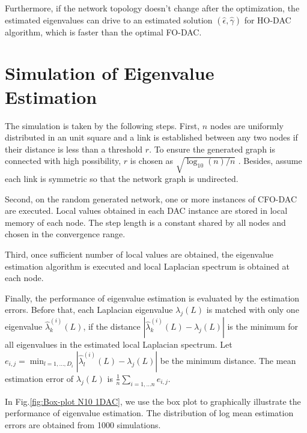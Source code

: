  Furthermore, if the network topology doesn't change after the optimization,
the estimated eigenvalues  can drive to an estimated  solution $\left(\hat{\epsilon},\hat{\gamma}\right)$
for HO-DAC algorithm, which is faster than the optimal FO-DAC. 


\section{\label{sec:Simulation-of-Eigenvalue}Simulation of Eigenvalue Estimation}

The simulation is taken by the following steps. First, $n$ nodes
are uniformly distributed in an unit square and a link is established
 between any two nodes if their distance is less than a   threshold
$r$. To ensure the generated graph is connected with high possibility,
 $r$ is chosen as $\sqrt{\log_{10}\left(n\right)/n}$ \cite{Li2010}.
Besides, assume  each link is symmetric so that the network graph
is undirected. 

Second, on the random generated network, one or more instances of
CFO-DAC  are executed. Local values obtained in each DAC instance
are stored in local memory of each node. The step length is a constant
shared by all nodes and chosen in the convergence range.

Third,  once sufficient number of local values are obtained, the eigenvalue
estimation algorithm is executed and local Laplacian spectrum is obtained
at each node.

Finally, the performance of eigenvalue estimation is evaluated by
the estimation errors. Before that, each Laplacian eigenvalue $\lambda_{j}\left(L\right)$
is matched with only one eigenvalue $\hat{\lambda}_{k}^{\left(i\right)}\left(L\right)$,
if the distance $\left|\hat{\lambda}_{k}^{\left(i\right)}\left(L\right)-\lambda_{j}\left(L\right)\right|$
is the minimum for all eigenvalues in the estimated local Laplacian
spectrum. Let $e_{i,j}=\min_{l=1,\ldots,D_{i}}\left|\hat{\lambda}_{l}^{\left(i\right)}\left(L\right)-\lambda_{j}\left(L\right)\right|$
be the minimum distance. The mean estimation error of $\lambda_{j}\left(L\right)$
is $\frac{1}{n}\sum_{i=1,\ldots n}e_{i,j}$. 

In Fig.\ref{fig:Box-plot N10 1DAC}, we use the box plot to graphically
illustrate the performance of eigenvalue estimation. The distribution
of log mean estimation errors are obtained from 1000 simulations.
 

